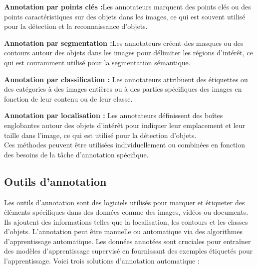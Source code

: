 \textemdash \textbf{ Annotation par points clés :}Les annotateurs marquent des points clés ou des points caractéristiques sur des objets dans les images, ce qui est souvent utilisé pour la détection et la reconnaissance d'objets.

\textemdash \textbf{ Annotation par segmentation :}Les annotateurs créent des masques ou des contours autour des objets dans les images pour délimiter les régions d'intérêt, ce qui est couramment utilisé pour la segmentation sémantique.

\textemdash \textbf{ Annotation par classification : }Les annotateurs attribuent des étiquettes ou des catégories à des images entières ou à des parties spécifiques des images en fonction de leur contenu ou de leur classe.

\textemdash \textbf{ Annotation par localisation : }Les annotateurs définissent des boîtes englobantes autour des objets d'intérêt pour indiquer leur emplacement et leur taille dans l'image, ce qui est utilisé pour la détection d'objets. \\

Ces méthodes peuvent être utilisées individuellement ou combinées en fonction des besoins de la tâche d'annotation spécifique.

\subsection{Outils d'annotation}
Les outils d'annotation sont des logiciels utilisés pour marquer et étiqueter des éléments spécifiques dans des données comme des images, vidéos ou documents. Ils ajoutent des informations telles que la localisation, les contours et les classes d'objets. L'annotation peut être manuelle ou automatique via des algorithmes d'apprentissage automatique. Les données annotées sont cruciales pour entraîner des modèles d'apprentissage supervisé en fournissant des exemples étiquetés pour l'apprentissage. Voici trois solutions d'annotation automatique :

